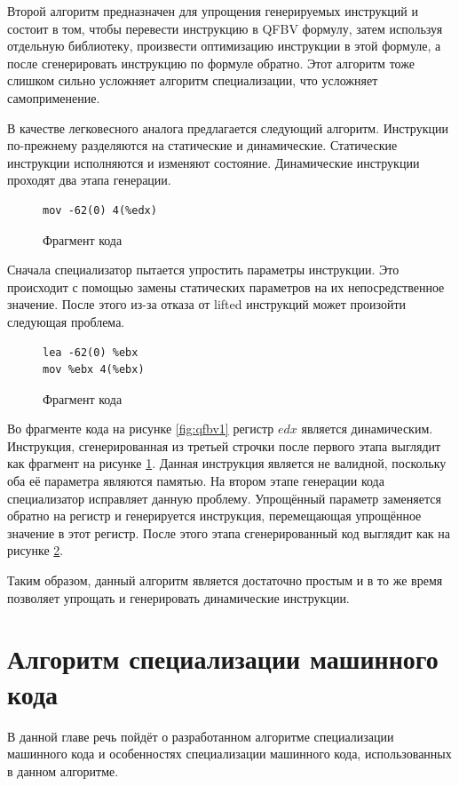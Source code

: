 Второй алгоритм предназначен для упрощения генерируемых инструкций и состоит в том, чтобы перевести инструкцию в QFBV формулу, затем используя отдельную библиотеку, произвести оптимизацию инструкции в этой формуле, а после сгенерировать инструкцию по формуле обратно. Этот алгоритм тоже слишком сильно усложняет алгоритм специализации, что усложняет самоприменение.

В качестве легковесного аналога предлагается следующий алгоритм. Инструкции по-прежнему разделяются на статические и динамические. Статические инструкции исполняются и изменяют состояние. Динамические инструкции проходят два этапа генерации. \begin{figure}
\begin{lstlisting}[xleftmargin = 20pt]
mov -62(0) 4(%edx)
\end{lstlisting}
\caption{Фрагмент кода}
\label{fig:qfbv2}
\end{figure}Сначала специализатор пытается упростить параметры инструкции. Это происходит с помощью замены статических параметров на их непосредственное значение. После этого из-за отказа от lifted инструкций может произойти следующая проблема. 

\begin{figure}
\begin{lstlisting}[xleftmargin = 20pt]
lea -62(0) %ebx 
mov %ebx 4(%ebx)
\end{lstlisting}
\caption{Фрагмент кода}
\label{fig:qfbv3}
\end{figure}

Во фрагменте кода на рисунке \ref{fig:qfbv1} регистр $edx$ является динамическим. Инструкция, сгенерированная из третьей строчки после первого этапа выглядит как фрагмент на рисунке \ref{fig:qfbv2}. 
Данная инструкция является не валидной, поскольку оба её параметра являются памятью. На втором этапе генерации кода специализатор исправляет данную проблему. Упрощённый параметр заменяется обратно на регистр и генерируется инструкция, перемещающая упрощённое значение в этот регистр. После этого этапа сгенерированный код выглядит как на рисунке \ref{fig:qfbv3}.

Таким образом, данный алгоритм является достаточно простым и в то же время позволяет упрощать и генерировать динамические инструкции.

\section{ Алгоритм специализации машинного кода}
В данной главе речь пойдёт о разработанном алгоритме специализации машинного кода и особенностях специализации машинного кода, использованных в данном алгоритме.

